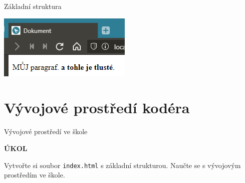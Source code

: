\documentclass[aspectratio=169]{beamer}
\begin{document}
\begin{frame}{Základní struktura}
    \begin{center}
        \includegraphics[width=\textwidth]{img/html-6-render.png}
    \end{center}
\end{frame}



\section{Vývojové prostředí kodéra}

\begin{frame}{Vývojové prostředí ve škole}
    \begin{cardTiny}
        \begin{center}
            \textbf{ÚKOL}
        \end{center}
        \begin{flushleft}
            Vytvořte si soubor \texttt{index.html} s základní strukturou. Naučte se s vývojovým prostředím ve škole.
        \end{flushleft}
    \end{cardTiny}
\end{frame}
\end{document}
